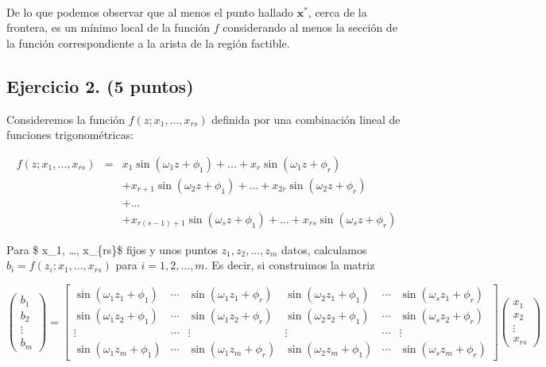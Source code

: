 \documentclass[11pt]{article}
\begin{document}
    \begin{center}
    \end{center}
    { \hspace*{\fill} \\}
    
    De lo que podemos observar que al menos el punto hallado
\(\mathbf{x}^\ast\), cerca de la frontera, es un mínimo local de la
función \(f\) considerando al menos la sección de la función
correspondiente a la arista de la región factible.

    \hypertarget{ejercicio-2.-5-puntos}{%
\subsection{Ejercicio 2. (5 puntos)}\label{ejercicio-2.-5-puntos}}

Consideremos la función \(f(z; x_1, ..., x_{rs})\) definida por una
combinación lineal de funciones trigonométricas:

\[
\begin{array}{rcl}
f(z; x_1, ...,  x_{rs}) &=&
x_1 \sin(\omega_1 z + \phi_1) + ... + x_{r} \sin(\omega_1 z + \phi_r)\\
& & + x_{r+1} \sin(\omega_2 z + \phi_1) + ... + x_{2r} \sin(\omega_2 z + \phi_r) \\
& & + ... \\
& & + x_{r(s-1)+1} \sin(\omega_{s}  z + \phi_1) + ... + x_{rs} \sin(\omega_{s} z + \phi_r)
\end{array}
\]

Para \$ x\_1, \ldots, x\_\{rs\}\$ fijos y unos puntos
\(z_1, z_2, ..., z_m\) datos, calculamos
\(b_i = f(z_i; x_1, ..., x_{rs})\) para \(i=1,2,...,m\). Es decir, si
construimos la matriz

\[
\left(
\begin{array}{l}
b_1 \\ b_2 \\ \vdots \\ b_m
\end{array}
\right)
=
\left[
\begin{array}{rrrrrr}
 \sin(\omega_1 z_1 + \phi_1) & \cdots & \sin(\omega_1 z_1 + \phi_r) & \sin(\omega_2 z_1 + \phi_1) &\cdots & \sin(\omega_{s} z_1 + \phi_r) \\
 \sin(\omega_1 z_2 + \phi_1) & \cdots & \sin(\omega_1 z_2 + \phi_r) & \sin(\omega_2 z_2 + \phi_1) &\cdots & \sin(\omega_{s} z_2 + \phi_r) \\
 \vdots                      & \cdots & \vdots                      & \vdots                      &\cdots & \vdots \\
 \sin(\omega_1 z_m + \phi_1) & \cdots & \sin(\omega_1 z_m + \phi_r) & \sin(\omega_2 z_m + \phi_1) &\cdots & \sin(\omega_{s} z_m + \phi_r) 
\end{array}
\right]
\left(
\begin{array}{l}
x_1 \\ x_2 \\ \vdots \\ x_{rs}
\end{array}
\right)
\]
\end{document}
